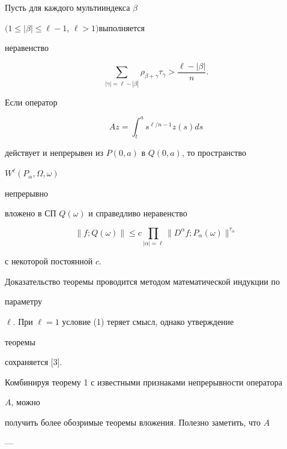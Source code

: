 \begin{thm} Пусть для каждого мультииндекса $\beta$ 


$(1\le|\beta|\le\ell-1$, $\ell>1)$выполняется 


неравенство 


\begin{equation} 


\sum_{|\gamma|=\ell-|\beta|}\rho_{\beta+\gamma}\tau_\gamma > 


\frac{\ell-|\beta|}{n}. 


\end{equation} 


Если оператор 


$$ 


A z=\int^a_t s^{\ell/n-1}z(s)ds 


$$ 


действует и непрерывен из $P(0,a)$ в $Q(0,a)$, то пространство 


$W^\ell(P_\alpha,\Omega,\omega)$ 


непрерывно 


вложено в СП $Q(\omega)$ и справедливо неравенство 


\begin{equation} 


\|f;Q(\omega)\|\le c\prod_{|\alpha|=\ell} 


\|D^\alpha f;P_\alpha(\omega)\|^{\tau_\alpha} 


\end{equation} 


с некоторой постоянной $c$. 


\end{thm} 


 


Доказательство теоремы проводится методом математической индукции по 


параметру 


$\ell$. При $\ell=1$ условие (1) теряет смысл, однако утверждение 


теоремы 


сохраняется [3]. 


 


Комбинируя теорему 1 с известными признаками непрерывности оператора 


$A$, можно 


получить более обозримые теоремы вложения. Полезно заметить, что $A$ 


--- 


